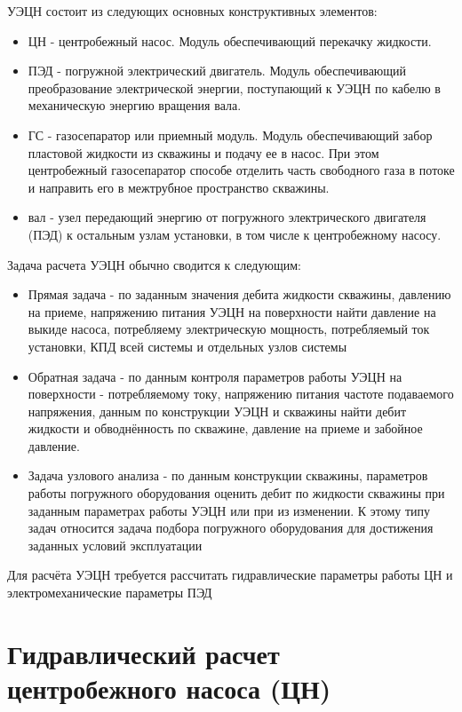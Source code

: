 \documentclass[]{scrreprt}
\begin{document}
УЭЦН состоит из следующих основных конструктивных элементов:
\begin{itemize}
	\item ЦН - центробежный насос. Модуль обеспечивающий перекачку жидкости.
	\item ПЭД - погружной электрический двигатель. Модуль обеспечивающий преобразование электрической энергии, поступающий к УЭЦН по кабелю в механическую энергию вращения вала.
	\item ГС - газосепаратор или приемный модуль. Модуль обеспечивающий забор пластовой жидкости из скважины и подачу ее в насос. При этом центробежный газосепаратор способе отделить часть свободного газа в потоке и направить его в межтрубное пространство скважины.
	\item вал - узел передающий энергию от погружного электрического двигателя (ПЭД) к остальным узлам установки, в том числе к центробежному насосу.
\end{itemize}

Задача расчета УЭЦН обычно сводится к следующим:
\begin{itemize}
	\item Прямая задача - по заданным значения дебита жидкости скважины,  давлению на приеме, напряжению питания УЭЦН на поверхности найти давление на выкиде насоса, потребляему электрическую мощность, потребляемый ток установки, КПД всей системы и отдельных узлов системы
	\item Обратная задача - по данным контроля параметров работы УЭЦН на поверхности - потребляемому току, напряжению питания частоте подаваемого напряжения, данным по конструкции УЭЦН и скважины найти дебит жидкости и обводнённость по скважине, давление на приеме и забойное давление.
	\item Задача узлового анализа - по данным конструкции скважины, параметров работы погружного оборудования оценить дебит по жидкости скважины при заданным параметрах работы УЭЦН или при из изменении. К этому типу задач относится задача подбора погружного оборудования для достижения заданных условий эксплуатации 
	
\end{itemize}

Для расчёта УЭЦН требуется рассчитать гидравлические параметры работы ЦН и электромеханические параметры ПЭД

\section{Гидравлический расчет центробежного насоса (ЦН)}
\end{document}
